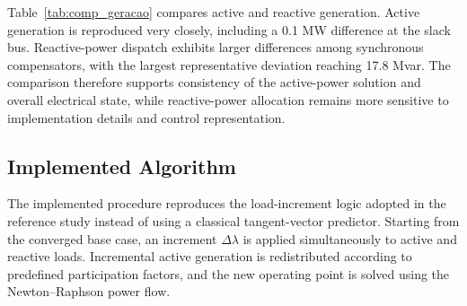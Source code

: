 \documentclass[conference]{IEEEtran}
\begin{document}
Table~\ref{tab:comp_geracao} compares active and reactive generation. Active generation is reproduced very closely, including a 0.1 MW difference at the slack bus. Reactive-power dispatch exhibits larger differences among synchronous compensators, with the largest representative deviation reaching 17.8 Mvar. The comparison therefore supports consistency of the active-power solution and overall electrical state, while reactive-power allocation remains more sensitive to implementation details and control representation.

\begin{table}[!t]
\centering
\caption{Generation Comparison: Python vs. ANAREDE}
\label{tab:comp_geracao}
\end{table}

\subsection{Implemented Algorithm}

The implemented procedure reproduces the load-increment logic adopted in the reference study instead of using a classical tangent-vector predictor. Starting from the converged base case, an increment $\Delta\lambda$ is applied simultaneously to active and reactive loads. Incremental active generation is redistributed according to predefined participation factors, and the new operating point is solved using the Newton--Raphson power flow.
\end{document}
